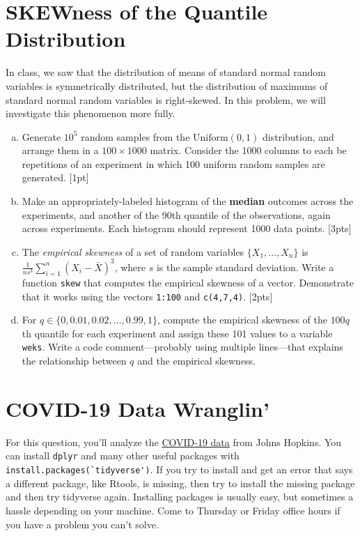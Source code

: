 \documentclass[12pt]{article}
\begin{document}
\section{SKEWness of the Quantile Distribution}

In class, we saw that the distribution of means of standard normal random variables is symmetrically distributed, but the distribution of maximums of standard normal random variables is right-skewed. In this problem, we will investigate this phenomenon more fully.

\begin{enumerate}[(a)]
	\item Generate $10^5$ random samples from the $\text{Uniform}(0,1)$ distribution, and arrange them in a $100 \times 1000$ matrix. Consider the 1000 columns to each be repetitions of an experiment in which 100 uniform random samples are generated. [1pt]
	\item Make an appropriately-labeled histogram of the \textbf{median} outcomes across the experiments, and another of the 90th quantile of the observations, again across experiments. Each histogram should represent 1000 data points. [3pts]
	\item The \textit{empirical skewness} of a set of random variables $\{X_1,\ldots,X_n\}$ is $\frac{1}{ns^3}\sum_{i=1}^n (X_i - \bar{X})^3$, where $s$ is the sample standard deviation. Write a function \verb|skew| that computes the empirical skewness of a vector. Demonstrate that it works using the vectors \verb|1:100| and \verb|c(4,7,4)|. [2pts]
	\item For $q \in \{0,0.01,0.02,\ldots,0.99,1\}$, compute the empirical skewness of the $100q$th quantile for each experiment and assign these 101 values to a variable \verb|weks|. Write a code comment---probably using multiple lines---that explains the relationship between $q$ and the empirical skewness.
\end{enumerate}

\section{COVID-19 Data Wranglin'}

For this question, you'll analyze the \href{https://data.world/covid-19-data-resource-hub/covid-19-case-counts/workspace/project-summary?agentid=covid-19-data-resource-hub&datasetid=covid-19-case-counts}{COVID-19 data} from Johns Hopkins. You can install \verb|dplyr| and many other useful packages with \verb|install.packages(`tidyverse')|. If you try to install and get an error that says a different package, like Rtools, is missing, then try to install the missing package and then try tidyverse again. Installing packages is usually easy, but sometimes a hassle depending on your machine. Come to Thursday or Friday office hours if you have a problem you can't solve.
\end{document}
